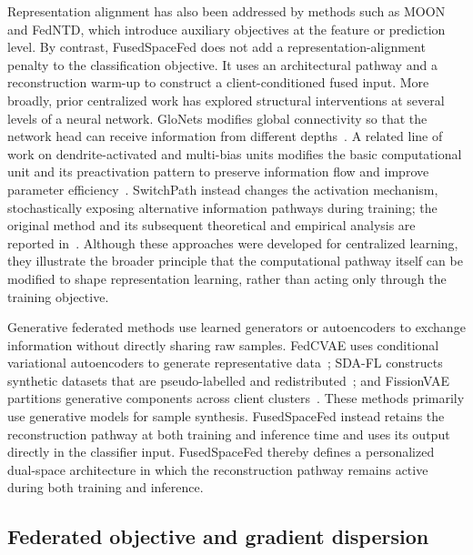 \documentclass[twoside]{article}
\theoremstyle{thmstyleone}%
\theoremstyle{thmstyletwo}%
\theoremstyle{thmstylethree}%
\begin{document}
Representation alignment has also been addressed by methods such as MOON and FedNTD, which introduce auxiliary objectives at the feature or prediction level. By contrast, FusedSpaceFed does not add a representation-alignment penalty to the classification objective. It uses an architectural pathway and a reconstruction warm-up to construct a client-conditioned fused input.
More broadly, prior centralized work has explored structural interventions at several levels of a neural network. GloNets modifies global connectivity so that the network head can receive information from different depths~\cite{dicecco2024glonets}. A related line of work on dendrite-activated and multi-bias units modifies the basic computational unit and its preactivation pattern to preserve information flow and improve parameter efficiency~\cite{metta2024increasingbiases,metta2025dac,metta2025increasingbiases}. SwitchPath instead changes the activation mechanism, stochastically exposing alternative information pathways during training; the original method and its subsequent theoretical and empirical analysis are reported in~\cite{dicecco2025switchpath,dicecco2025switchpathjournal}. Although these approaches were developed for centralized learning, they illustrate the broader principle that the computational pathway itself can be modified to shape representation learning, rather than acting only through the training objective.

Generative federated methods use learned generators or autoencoders to exchange information without directly sharing raw samples. FedCVAE uses conditional variational autoencoders to generate representative data~\cite{tu2021fedcvae}; SDA-FL constructs synthetic datasets that are pseudo-labelled and redistributed~\cite{qu2022sdafl}; and FissionVAE partitions generative components across client clusters~\cite{zhang2024fissionvae}. These methods primarily use generative models for sample synthesis. FusedSpaceFed instead retains the reconstruction pathway at both training and inference time and uses its output directly in the classifier input. FusedSpaceFed thereby defines a personalized dual-space architecture
in which the reconstruction pathway remains active during both training and
inference.

\subsection{Federated objective and gradient dispersion}
\end{document}
